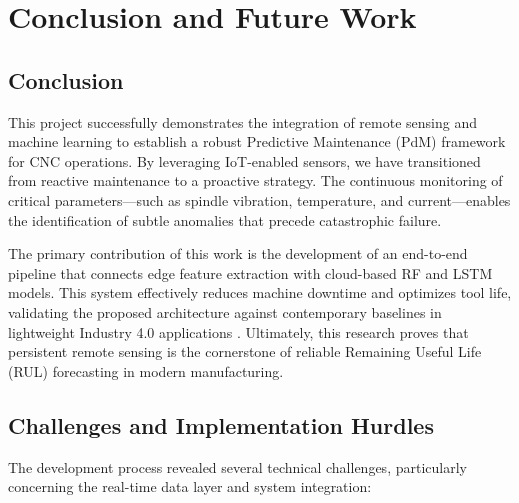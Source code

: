 \chapter{Conclusion and Future Work}
\label{Chapter 6}

\section{Conclusion}
This project successfully demonstrates the integration of remote sensing and machine learning to establish a robust Predictive Maintenance (PdM) framework for CNC operations. By leveraging IoT-enabled sensors, we have transitioned from reactive maintenance to a proactive strategy. The continuous monitoring of critical parameters—such as spindle vibration, temperature, and current—enables the identification of subtle anomalies that precede catastrophic failure. 

The primary contribution of this work is the development of an end-to-end pipeline that connects edge feature extraction with cloud-based RF and LSTM models. This system effectively reduces machine downtime and optimizes tool life, validating the proposed architecture against contemporary baselines in lightweight Industry 4.0 applications \cite{thoppil2025iiot, pu2026deeplearning}. Ultimately, this research proves that persistent remote sensing is the cornerstone of reliable Remaining Useful Life (RUL) forecasting in modern manufacturing.

\section{Challenges and Implementation Hurdles}
The development process revealed several technical challenges, particularly concerning the real-time data layer and system integration:

